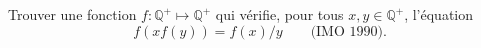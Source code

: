 Trouver une fonction $f : \mathbb{Q}^+ \mapsto \mathbb{Q}^+$ qui vérifie, pour tous $x, y \in \mathbb{Q}^+$, l'équation
\[ f(xf(y)) = f(x)/y \qquad \text{(IMO 1990).} \]
